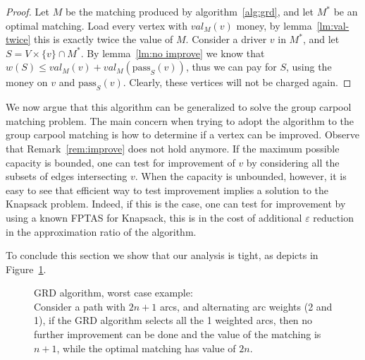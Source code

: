 \begin{proof}
Let $M$ be the matching produced by algorithm~\ref{alg:grd}, 
and let $M^*$ be an optimal matching.
Load every vertex with $val_M(v)$ money, 
by lemma~\ref{lm:val-twice} this is exactly twice the value of $M$.
Consider a driver $v$ in $M^*$, and let $S = V \times \{v\} \cap M^*$.
By lemma~\ref{lm:no improve} we know that $w(S) \leq val_M(v) + val_M(\text{pass}_S(v))$,
thus we can pay for $S$, using the money on $v$ and $\text{pass}_S(v)$.
Clearly, these vertices will not be charged again.
\end{proof}

We now argue that this algorithm can be generalized to solve the group carpool
matching problem.
The main concern when trying to adopt the algorithm to the group carpool
matching is how to determine if a vertex can be improved.
Observe that Remark~\ref{rem:improve} does not hold anymore.
If the maximum possible capacity is bounded, one can test for improvement of
$v$ by considering all the subsets of edges intersecting $v$. 
When the capacity is unbounded, however, it is easy to see that efficient
way to test improvement implies a solution to the Knapsack problem.
Indeed, if this is the case, one can test for improvement by using a known FPTAS
for Knapsack, this is in the cost of additional $\varepsilon$ reduction in the
approximation ratio of the algorithm.

To conclude this section we show that our analysis is tight, 
as depicts in Figure~\ref{fig:grd worst}.
\begin{figure}
\centering

\caption[]{
\label{fig:grd worst}
GRD algorithm, worst case example: \\
Consider a path with $2n + 1$ arcs,
and alternating arc weights (2 and 1),
if the GRD algorithm selects all the 1 weighted arcs,
then no further improvement can be done and the value of the matching is $n + 1$,
while the optimal matching has value of $2n$.
}
\end{figure}